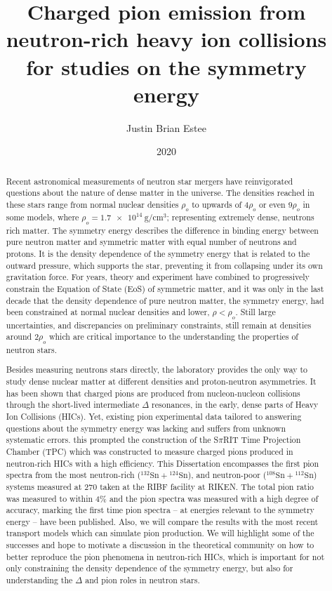 \documentclass[]{msu-thesis}
\title{Charged pion emission from neutron-rich heavy ion collisions for studies on the symmetry energy}
\author{Justin Brian Estee}
\date{2020}
\newcommand{\spirit}{S$\pi$RIT }
\newcommand{\tin}[2]{{}^{#1}\mathrm{Sn} + {}^{#2}\mathrm{Sn}}
\begin{document}

\frontmatter
\maketitlepage
\begin{abstract}

Recent astronomical measurements of neutron star mergers have reinvigorated questions about the nature of dense matter in the universe. The densities reached in these stars range from normal nuclear densities $\rho_o$ to upwards of $4\rho_o$ or even $9\rho_o$ in some models, where $\rho_o = \SI{1.7e14}{\gram\per\centi\metre\cubed}$; representing extremely dense, neutrons rich matter. The symmetry energy describes the difference in binding energy between pure neutron matter and symmetric matter with equal number of neutrons and protons. It is the density dependence of the symmetry energy that is related to the outward pressure, which supports the star, preventing it from collapsing under its own gravitation force. For years, theory and experiment  have combined to progressively constrain the Equation of State (EoS) of symmetric matter, and it was only in the last decade that the density dependence of pure neutron matter, the symmetry energy, had been constrained at normal nuclear densities and lower, $\rho < \rho_o$. Still large uncertainties, and discrepancies on preliminary constraints,  still remain at densities around 2$\rho_o$ which are critical importance to the understanding the properties of neutron stars.

Besides measuring neutrons stars directly, the laboratory provides the only way to study dense nuclear matter at different densities and proton-neutron asymmetries. It has been shown that charged pions are produced from nucleon-nucleon collisions through the short-lived intermediate $\Delta$ resonances, in the early, dense parts of Heavy Ion Collisions (HICs). Yet, existing pion experimental data tailored to answering questions about the symmetry energy was lacking and suffers from unknown systematic errors. this prompted the construction of the \spirit Time Projection Chamber (TPC) which was constructed to measure charged pions produced in neutron-rich HICs with a high efficiency. This Dissertation encompasses the first pion spectra from the most neutron-rich ($\tin{132}{124}$), and neutron-poor ($\tin{108}{112}$) systems measured at \SI{270}{\MeVA} taken at the RIBF facility at RIKEN. The total pion ratio was measured to within 4\% and the pion spectra was measured with a high degree of accuracy, marking the first time pion spectra  -- at energies relevant to the symmetry energy -- have been published.  Also, we will compare the results with the most recent transport models which can simulate pion production. We will highlight some of the successes and hope to motivate a discussion in the theoretical community on how to better reproduce the pion phenomena in neutron-rich HICs, which is important for not only constraining the density dependence of the symmetry energy, but also for understanding the $\Delta$ and pion roles in neutron stars. 


\end{abstract}
\end{document}
